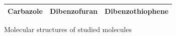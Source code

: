 \begin{figure}[p]
\begin{center}
{\begin{tabular}{c c c}
 			  \textbf{Carbazole} &  \textbf{Dibenzofuran} & \textbf{Dibenzothiophene}\\
 			  \bottomrule
 		\end{tabular}}
 	\end{center}
 	\caption{Molecular structures of studied molecules}
 \end{figure}





